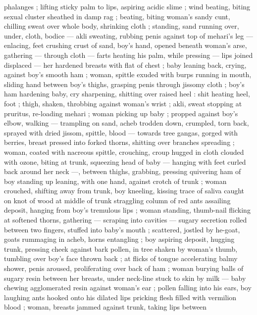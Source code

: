 phalanges ; lifting sticky palm to lips, aspiring acidic slime ; wind 
beating, biting sexual cluster sheathed in damp rag ; beating, biting 
woman's sandy cunt, chilling sweat over whole body, shrinking cloth 
; standing, sand running over, under, cloth, bodice --- akli sweating, 
rubbing penis against top of mehari's leg --- enlacing, feet crushing 
crust of sand, boy's hand, opened beneath woman's arse, gathering 
--- through cloth --- farts heating his palm, while pressing --- lips 
joined displaced --- her hardened breasts with flat of chest ; baby 
leaning back, crying, against boy's smooth ham ; woman, spittle 
exuded with burps running in mouth, sliding hand between boy's 
thighs, grasping penis through jissomy cloth ; boy's ham hardening 
{\col} baby, cry sharpening, shitting over raised heel : shit heating heel, 
foot ; thigh, shaken, throbbing against woman's wrist ; akli, sweat 
stopping at pruritus, re-loading mehari ; woman picking up baby ; 
propped against boy's elbow, walking --- trampling on sand, acheb 
trodden down, crumpled, torn back, sprayed with dried jissom, 
spittle, blood --- towards tree {\col} gangas, gorged with berries, breast 
pressed into forked thorns, shitting over branches spreading ; 
woman, coated with nacreous spittle, crouching, croup hugged in 
cloth clouded with ozone, biting at trunk, squeezing head of baby --- 
hanging with feet curled back around her neck ---, between thighs, 
grabbing, pressing quivering ham of boy standing up leaning, with 
one hand, against crotch of trunk ; woman crouched, shifting away 
from trunk, boy kneeling, kissing trace of saliva caught on knot of 
wood at middle of trunk {\col} straggling column of red ants assailing 
deposit, hanging from boy's tremulous lips ; woman standing, 
thumb-nail flicking at softened thorns, gathering --- scraping into 
cavities --- sugary secretion {\col} rolled between two fingers, stuffed into 
baby's mouth ; scattered, jostled by he-goat, goats rummaging in 
acheb, horns entangling ; boy aspiring deposit, hugging trunk, 
pressing cheek against bark {\col} pollen, in tree shaken by woman's 
thumb, tumbling over boy's face thrown back ; at flicks of tongue 
accelerating balmy shower, penis aroused, proliferating over back of 
ham ; woman burying balls of sugary resin between her breasts, 
under neck-line stuck to skin by milk --- baby chewing agglomerated 
resin against woman's ear ; pollen falling into his ears, boy laughing 
{\col} ants hooked onto his dilated lips {\col} pricking flesh filled with vermilion 
blood ; woman, breasts jammed against trunk, taking lips between 
